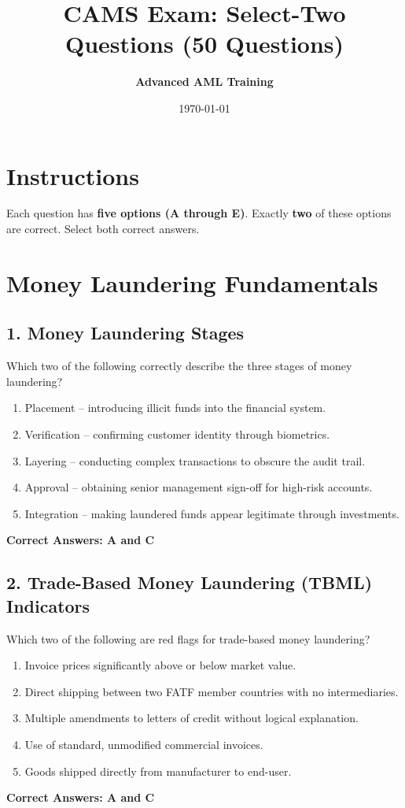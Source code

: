 \documentclass[11pt,a4paper]{article}
\title{\textbf{CAMS Exam: Select-Two Questions (50 Questions)}}
\author{\textbf{Advanced AML Training}}
\date{\today}
\begin{document}
	
	\maketitle
	
	\section*{Instructions}
	Each question has \textbf{five options (A through E)}. Exactly \textbf{two} of these options are correct. Select both correct answers.
	
	\section{Money Laundering Fundamentals}
	
	\subsection{1. Money Laundering Stages}
	Which two of the following correctly describe the three stages of money laundering?
	\begin{enumerate}[label=\Alph*.]
		\item Placement – introducing illicit funds into the financial system.
		\item Verification – confirming customer identity through biometrics.
		\item Layering – conducting complex transactions to obscure the audit trail.
		\item Approval – obtaining senior management sign-off for high-risk accounts.
		\item Integration – making laundered funds appear legitimate through investments.
	\end{enumerate}
	\textbf{Correct Answers: A and C}
	
	\subsection{2. Trade-Based Money Laundering (TBML) Indicators}
	Which two of the following are red flags for trade-based money laundering?
	\begin{enumerate}[label=\Alph*.]
		\item Invoice prices significantly above or below market value.
		\item Direct shipping between two FATF member countries with no intermediaries.
		\item Multiple amendments to letters of credit without logical explanation.
		\item Use of standard, unmodified commercial invoices.
		\item Goods shipped directly from manufacturer to end-user.
	\end{enumerate}
	\textbf{Correct Answers: A and C}
	
\end{document}
